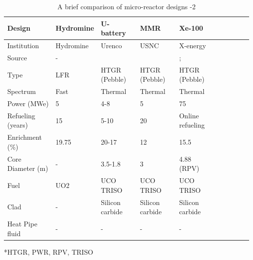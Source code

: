 \begin{landscape}
\begin{table} [ht]
\begin{center}
\caption{A brief comparison of micro-reactor designs -2}
\label{microreactors-2}
\begin{tabular}{|l|l|l|l|l|l|l|l|l|l|}
\hline 
Design 		& Hydromine & U-battery 	& MMR 	& Xe-100 \\ 
\hline 
Institution  & Hydromine & Urenco 	& USNC	& X-energy \\ 
Source 			& - &\cite{ding_design_2011}  	&\cite{venneri_neutronic_2015} 	&\cite{iaea_advances_2018}; \cite{harlan_x-energy_2018} \\ 
Type			&  LFR & HTGR (Pebble)	& HTGR (Pebble) & HTGR (Pebble)\\ 
Spectrum	& Fast	&	Thermal		&Thermal &Thermal\\ 
Power (MWe)	  	& 5		&4-8		&5	&75\\ 
Refueling (years) & 15 &5-10 	&20		&Online refueling\\ 
Enrichment (\%)  &19.75 &20-17	&12		&15.5\\ 
Core  Diameter (m)&- &3.5-1.8		& 3 	& 4.88 (RPV)\\ 
Fuel			& UO2&UCO TRISO	&UCO TRISO	&UCO TRISO\\ 
Clad			& -&Silicon carbide		&Silicon carbide 	&Silicon carbide\\ 
Heat Pipe fluid	&-&	-			&	-		&-\\ 
\hline
\end{tabular}

*\gls{HTGR}, \gls{PWR}, \gls{RPV}, \gls{TRISO}
\end{center}
\end{table}
\end{landscape}
\restoregeometry
\pagebreak

